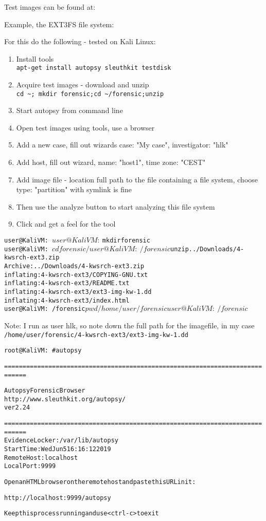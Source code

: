 \documentclass[a4paper,11pt,notitlepage]{report}
\begin{document}
Test images can be found at:\\

Example, the EXT3FS file system:\\

For this do the following - tested on Kali Linux:
\begin{enumerate}
\item Install tools\\
\verb+apt-get install autopsy sleuthkit testdisk+
\item Acquire test images - download and unzip\\
\verb+cd ~; mkdir forensic;cd ~/forensic;unzip  +
\item Start autopsy from command line
\item Open test images using tools, use a browser 
\item Add a new case, fill out wizards case: "My case", investigator: "hlk"
\item Add host, fill out wizard, name: "host1", time zone: "CEST"
\item Add image file - location full path to the file containing a file system, choose type: "partition" with symlink is fine
\item Then use the analyze button to start analyzing this file system
\item Click and get a feel for the tool
\end{enumerate}

\begin{alltt}
user@KaliVM:~$
user@KaliVM:~$ mkdir forensic
user@KaliVM:~$ cd forensic/
user@KaliVM:~/forensic$ unzip ../Downloads/4-kwsrch-ext3.zip
Archive:  ../Downloads/4-kwsrch-ext3.zip
  inflating: 4-kwsrch-ext3/COPYING-GNU.txt
  inflating: 4-kwsrch-ext3/README.txt
  inflating: 4-kwsrch-ext3/ext3-img-kw-1.dd
  inflating: 4-kwsrch-ext3/index.html
user@KaliVM:~/forensic$ pwd
/home/user/forensic
user@KaliVM:~/forensic$
\end{alltt}

Note: I run as user hlk, so note down the full path for the imagefile, in my case \verb+/home/user/forensic/4-kwsrch-ext3/ext3-img-kw-1.dd+


\begin{alltt}
root@KaliVM:~# autopsy

============================================================================

                       Autopsy Forensic Browser
                  http://www.sleuthkit.org/autopsy/
                             ver 2.24

============================================================================
Evidence Locker: /var/lib/autopsy
Start Time: Wed Jun  5 16:16:12 2019
Remote Host: localhost
Local Port: 9999

Open an HTML browser on the remote host and paste this URL in it:

    http://localhost:9999/autopsy

Keep this process running and use <ctrl-c> to exit
\end{alltt}
\end{document}
